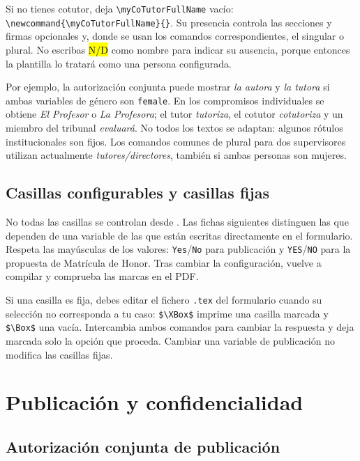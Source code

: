\documentclass[10pt,a4paper]{article}
\newcommand{\variable}[1]{\texttt{\textbackslash{}}\nolinkurl{#1}}
\newcommand{\fichero}[1]{\path{#1}}
\begin{document}
Si no tienes cotutor, deja \variable{myCoTutorFullName} vacío: \verb|\newcommand{\myCoTutorFullName}{}|. Su presencia controla las secciones y firmas opcionales y, donde se usan los comandos correspondientes, el singular o plural. No escribas \hl{N/D} como nombre para indicar su ausencia, porque entonces la plantilla lo tratará como una persona configurada.

Por ejemplo, la autorización conjunta puede mostrar \emph{la autora} y \emph{la tutora} si ambas variables de género son \texttt{female}. En los compromisos individuales se obtiene \emph{El Profesor} o \emph{La Profesora}; el tutor \emph{tutoriza}, el cotutor \emph{cotutoriza} y un miembro del tribunal \emph{evaluará}. No todos los textos se adaptan: algunos rótulos institucionales son fijos. Los comandos comunes de plural para dos supervisores utilizan actualmente \emph{tutores/directores}, también si ambas personas son mujeres.

\subsection{Casillas configurables y casillas fijas}

No todas las casillas se controlan desde \fichero{Config/myconfig.tex}. Las fichas siguientes distinguen las que dependen de una variable de las que están escritas directamente en el formulario. Respeta las mayúsculas de los valores: \texttt{Yes}/\texttt{No} para publicación y \texttt{YES}/\texttt{NO} para la propuesta de Matrícula de Honor. Tras cambiar la configuración, vuelve a compilar y comprueba las marcas en el PDF.

Si una casilla es fija, debes editar el fichero \texttt{.tex} del formulario cuando su selección no corresponda a tu caso: \verb|$\XBox$| imprime una casilla marcada y \verb|$\Box$| una vacía. Intercambia ambos comandos para cambiar la respuesta y deja marcada solo la opción que proceda. Cambiar una variable de publicación no modifica las casillas fijas.

\section{Publicación y confidencialidad}

\subsection{Autorización conjunta de publicación}\label{form:conjunta}
\end{document}
